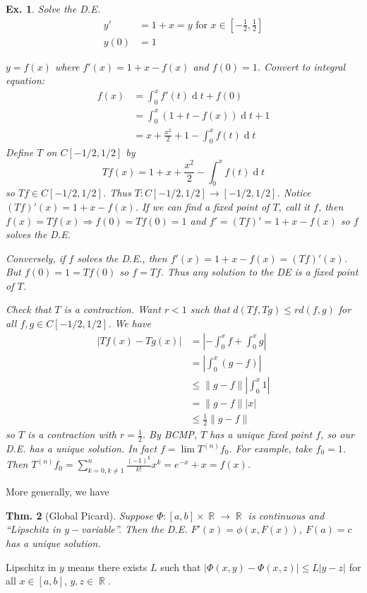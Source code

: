 \documentclass[12pt, a4paper]{book}
\DeclareMathOperator{\R}{\mathbb{R}}
\renewcommand{\d}[1]{\ensuremath{\operatorname{d}\!{#1}}} %
\newcommand{\norm}[1]{\left\lVert#1\right\rVert} %
\newtheorem{theorem}{Thm.}[section]
\newtheorem{example}[theorem]{Ex.}
\theoremstyle{nonumberplain}
\begin{document}
\begin{example}
    Solve the D.E.
    \begin{align*}
        y' &= 1+x=y\text{ for } x\in\left[-\frac{1}{2},\frac{1}{2}\right]\\
        y(0) &= 1
    \end{align*}

    $y=f(x)$ where $f'(x)=1+x-f(x)$ and $f(0)=1$.
    Convert to integral equation:
    \begin{align*}
        f(x) &= \int_0^x f'(t)\d{t}+f(0)\\
             &= \int_0^x(1+t-f(x))\d{t}+1\\
             &= x+\frac{x^2}{2}+1-\int_0^x f(t)\d{t}
    \end{align*}
    Define $T$ on $C[-1/2,1/2]$ by
    \[Tf(x)=1+x+\frac{x^2}{2}-\int_0^x f(t)\d{t}\]
    so $Tf\in C[-1/2,1/2]$.
    Thus $T:C[-1/2,1/2]\to[-1/2,1/2]$.
    Notice $(Tf)'(x)=1+x-f(x)$.
    If we can find a fixed point of $T$, call it $f$, then $f(x)=Tf(x)\Rightarrow f(0)=Tf(0)=1$ and $f'=(Tf)'=1+x-f(x)$ so $f$ solves the D.E.

    Conversely, if $f$ solves the D.E., then $f'(x)=1+x-f(x)=(Tf)'(x)$.
    But $f(0)=1=Tf(0)$ so $f=Tf$.
    Thus any solution to the DE is a fixed point of $T$.

    Check that $T$ is a contraction.
    Want $r<1$ such that $d(Tf,Tg)\leq rd(f,g)$ for all $f,g\in C[-1/2,1/2]$.
    We have
    \begin{align*}
        |Tf(x)-Tg(x)| &= \left\lvert-\int_0^x f+\int_0^x g\right\rvert\\
                      &= \left\lvert\int_0^x(g-f)\right\rvert\\
                      &\leq \norm{g-f}\left\lvert\int_0^x 1\right\rvert\\
                      &= \norm{g-f}|x|\\
                      &\leq\frac{1}{2}\norm{g-f}
    \end{align*}
    so $T$ is a contraction with $r=\frac{1}{2}$.
    By BCMP, $T$ has a unique fixed point $f$, so our D.E. has a unique solution.
    In fact $f=\lim T^{(n)} f_0$.
    For example, take $f_0=1$.
    Then $T^{(n)}f_0=\sum\limits_{k=0,k\neq 1}^n\frac{(-1)^k}{k!}x^k=e^{-x}+x=f(x)$.
\end{example}
More generally, we have
\begin{theorem}[Global Picard]
    Suppose $\Phi:[a,b]\times\R\to\R$ is continuous and ``Lipschitz in $y-$variable''.
    Then the D.E. $F'(x)=\phi(x,F(x))$, $F(a)=c$ has a unique solution.
\end{theorem}
Lipschitz in $y$ means there exists $L$ such that $\left\lvert\Phi(x,y)-\Phi(x,z)\right\rvert\leq L|y-z|$ for all $x\in[a,b]$, $y,z\in\R$.
\end{document}
